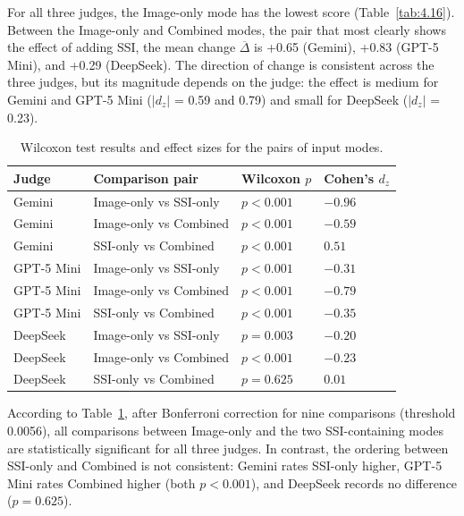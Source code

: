 \documentclass[12pt,a4paper]{report}
\begin{document}
For all three judges, the Image-only mode has the lowest score (Table~\ref{tab:4.16}). Between the Image-only and Combined modes, the pair that most clearly shows the effect of adding SSI, the mean change $\overline{\Delta}$ is +0.65 (Gemini), +0.83 (GPT-5 Mini), and +0.29 (DeepSeek). The direction of change is consistent across the three judges, but its magnitude depends on the judge: the effect is medium for Gemini and GPT-5 Mini ($|d_z|$ = 0.59 and 0.79) and small for DeepSeek ($|d_z|$ = 0.23).

\begin{table}[H]
    \centering
    \footnotesize
    \renewcommand{\arraystretch}{1.25}
    \caption{Wilcoxon test results and effect sizes for the pairs of input modes.}
    \label{tab:4.17}
    \begin{tabularx}{\linewidth}{
        >{\RaggedRight\arraybackslash}X
        >{\RaggedRight\arraybackslash}p{4.4cm}
        >{\Centering\arraybackslash}X
        >{\Centering\arraybackslash}X
    }
        \toprule
        \textbf{Judge} & \textbf{Comparison pair} & \textbf{Wilcoxon $p$} & \textbf{Cohen's $d_z$} \\
        \midrule
        Gemini & Image-only vs SSI-only & $p<0.001$ & $-0.96$ \\
        Gemini & Image-only vs Combined & $p<0.001$ & $-0.59$ \\
        Gemini & SSI-only vs Combined & $p<0.001$ & $0.51$ \\
        GPT-5 Mini & Image-only vs SSI-only & $p<0.001$ & $-0.31$ \\
        GPT-5 Mini & Image-only vs Combined & $p<0.001$ & $-0.79$ \\
        GPT-5 Mini & SSI-only vs Combined & $p<0.001$ & $-0.35$ \\
        DeepSeek & Image-only vs SSI-only & $p=0.003$ & $-0.20$ \\
        DeepSeek & Image-only vs Combined & $p<0.001$ & $-0.23$ \\
        DeepSeek & SSI-only vs Combined & $p=0.625$ & $0.01$ \\
        \bottomrule
    \end{tabularx}
\end{table}

According to Table~\ref{tab:4.17}, after Bonferroni correction for nine comparisons (threshold 0.0056), all comparisons between Image-only and the two SSI-containing modes are statistically significant for all three judges. In contrast, the ordering between SSI-only and Combined is not consistent: Gemini rates SSI-only higher, GPT-5 Mini rates Combined higher (both $p<0.001$), and DeepSeek records no difference ($p=0.625$).
\end{document}
